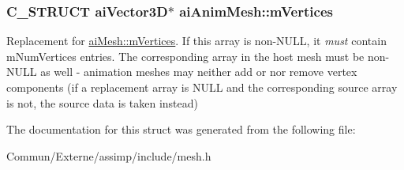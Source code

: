 \subsubsection[{\texorpdfstring{m\+Vertices}{mVertices}}]{\setlength{\rightskip}{0pt plus 5cm}C\+\_\+\+S\+T\+R\+U\+CT {\bf ai\+Vector3D}$\ast$ ai\+Anim\+Mesh\+::m\+Vertices}\hypertarget{structai_anim_mesh_a0ac2dd4c1afd23e6a9293b1d0ded3060}{}\label{structai_anim_mesh_a0ac2dd4c1afd23e6a9293b1d0ded3060}
Replacement for \hyperlink{structai_mesh_afd4588abb3e1c72821ae0234a3850662}{ai\+Mesh\+::m\+Vertices}. If this array is non-\/\+N\+U\+LL, it {\itshape must} contain m\+Num\+Vertices entries. The corresponding array in the host mesh must be non-\/\+N\+U\+LL as well -\/ animation meshes may neither add or nor remove vertex components (if a replacement array is N\+U\+LL and the corresponding source array is not, the source data is taken instead) 

The documentation for this struct was generated from the following file\+:\begin{DoxyCompactItemize}
\item 
Commun/\+Externe/assimp/include/mesh.\+h\end{DoxyCompactItemize}
